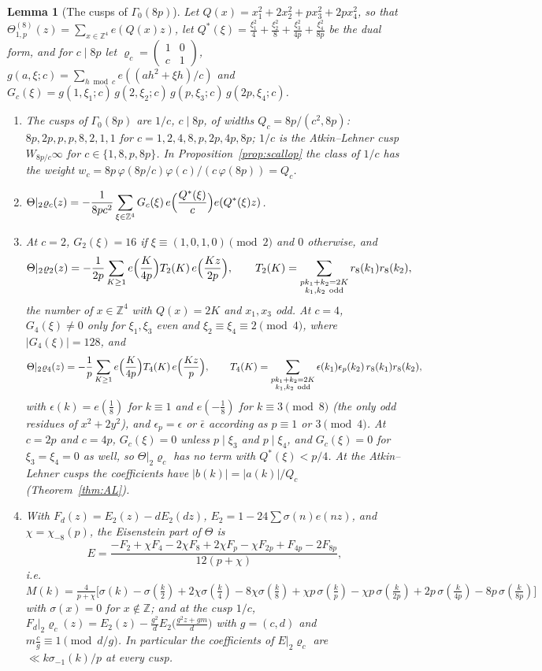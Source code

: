 \documentclass[11pt]{amsart}
\newtheorem{lemma}[theorem]{Lemma}
\theoremstyle{remark}
\newcommand{\Z}{\mathbb{Z}}
\begin{document}
\begin{lemma}[The cusps of $\Gamma_0(8p)$]\label{lem:cusps8}
Let $Q(x)=x_1^2+2x_2^2+px_3^2+2px_4^2$, so that $\Theta^{(8)}_{1,p}(z)=\sum_{x\in\Z^4}e(Q(x)z)$, let $Q^*(\xi)=\frac{\xi_1^2}4+\frac{\xi_2^2}8+\frac{\xi_3^2}{4p}+\frac{\xi_4^2}{8p}$ be the dual form, and for $c\mid8p$ let $\varrho_c=\left(\begin{smallmatrix}1&0\\c&1\end{smallmatrix}\right)$, $g(a,\xi;c)=\sum_{h\bmod c}e((ah^2+\xi h)/c)$ and $G_c(\xi)=g(1,\xi_1;c)\,g(2,\xi_2;c)\,g(p,\xi_3;c)\,g(2p,\xi_4;c)$.
\begin{enumerate}[label=\textup{(\roman*)},leftmargin=2.2em]
\item The cusps of $\Gamma_0(8p)$ are $1/c$, $c\mid8p$, of widths $Q_c=8p/(c^2,8p)$: $8p,2p,p,p,8,2,1,1$ for $c=1,2,4,8,p,2p,4p,8p$; $1/c$ is the Atkin--Lehner cusp $W_{8p/c}\infty$ for $c\in\{1,8,p,8p\}$. In Proposition~\ref{prop:scallop} the class of $1/c$ has the weight $w_c=8p\,\varphi(8p/c)\varphi(c)/(c\,\varphi(8p))=Q_c$.
\item $\Theta|_2\varrho_c(z)=-\dfrac1{8pc^2}\displaystyle\sum_{\xi\in\Z^4}G_c(\xi)\,e\Bigl(\frac{Q^*(\xi)}c\Bigr)e(Q^*(\xi)z)$.
\item At $c=2$, $G_2(\xi)=16$ if $\xi\equiv(1,0,1,0)\pmod2$ and $0$ otherwise, and
\[
\Theta|_2\varrho_2(z)=-\frac1{2p}\sum_{K\ge1}e\Bigl(\frac K{4p}\Bigr)T_2(K)\,e\Bigl(\frac{Kz}{2p}\Bigr),\qquad T_2(K)=\sum_{\substack{pk_1+k_2=2K\\ k_1,k_2\ \mathrm{odd}}}r_8(k_1)r_8(k_2),
\]
the number of $x\in\Z^4$ with $Q(x)=2K$ and $x_1,x_3$ odd. At $c=4$, $G_4(\xi)\ne0$ only for $\xi_1,\xi_3$ even and $\xi_2\equiv\xi_4\equiv2\pmod4$, where $|G_4(\xi)|=128$, and
\[
\Theta|_2\varrho_4(z)=-\frac1p\sum_{K\ge1}e\Bigl(\frac K{4p}\Bigr)T_4(K)\,e\Bigl(\frac{Kz}p\Bigr),\qquad T_4(K)=\sum_{\substack{pk_1+k_2=2K\\ k_1,k_2\ \mathrm{odd}}}\epsilon(k_1)\epsilon_p(k_2)\,r_8(k_1)r_8(k_2),
\]
with $\epsilon(k)=e(\frac18)$ for $k\equiv1$ and $e(-\frac18)$ for $k\equiv3\pmod 8$ (the only odd residues of $x^2+2y^2$), and $\epsilon_p=\epsilon$ or $\bar\epsilon$ according as $p\equiv1$ or $3\pmod4$. At $c=2p$ and $c=4p$, $G_c(\xi)=0$ unless $p\mid\xi_3$ and $p\mid\xi_4$, and $G_c(\xi)=0$ for $\xi_3=\xi_4=0$ as well, so $\Theta|_2\varrho_c$ has no term with $Q^*(\xi)<p/4$. At the Atkin--Lehner cusps the coefficients have $|b(k)|=|a(k)|/Q_c$ (Theorem~\ref{thm:AL}).
\item With $F_d(z)=E_2(z)-dE_2(dz)$, $E_2=1-24\sum\sigma(n)e(nz)$, and $\chi=\chi_{-8}(p)$, the Eisenstein part of $\Theta$ is
\[
E=\frac{-F_2+\chi F_4-2\chi F_8+2\chi F_p-\chi F_{2p}+F_{4p}-2F_{8p}}{12(p+\chi)},
\]
i.e.\ $M(k)=\frac4{p+\chi}\bigl[\sigma(k)-\sigma(\frac k2)+2\chi\sigma(\frac k4)-8\chi\sigma(\frac k8)+\chi p\,\sigma(\frac kp)-\chi p\,\sigma(\frac k{2p})+2p\,\sigma(\frac k{4p})-8p\,\sigma(\frac k{8p})\bigr]$ with $\sigma(x)=0$ for $x\notin\Z$; and at the cusp $1/c$, $F_d|_2\varrho_c(z)=E_2(z)-\frac{g^2}dE_2\bigl(\frac{g^2z+gm}d\bigr)$ with $g=(c,d)$ and $m\frac cg\equiv1\pmod{d/g}$. In particular the coefficients of $E|_2\varrho_c$ are $\ll k\sigma_{-1}(k)/p$ at every cusp.
\end{enumerate}
\end{lemma}
\end{document}
